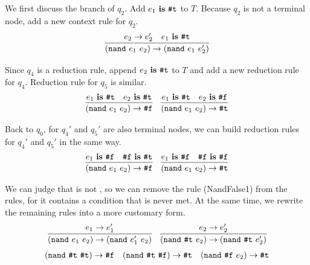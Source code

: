 \begin{example}
    We first discuss the branch of $q_2$. Add $e_1~\mbox{\rm \bf is}~\mbox{\tt \#t}$ to $T$. Because $q_2$ is not a terminal node, add a new context rule for $q_2$.
    \[
        \infer{(\m{nand}~e_1~e_2) \to (\m{nand}~e_1~e_2')}{e_2 \to e_2'\quad e_1~\key{is}~\m{\#t}}
    \]

    Since $q_4$ is a reduction rule, append $e_2~\mbox{\rm \bf is}~\mbox{\tt \#t}$ to $T$ and add a new reduction rule for $q_4$. Reduction rule for $q_5$ is similar.
    \[
        \begin{array}{c}
            \infer{(\m{nand}~e_1~e_2) \to \m{\#f}}{e_1~\key{is}~\m{\#t}\quad e_2~\key{is}~\m{\#t}}
            \quad
            \infer{(\m{nand}~e_1~e_2) \to \m{\#t}}{e_1~\key{is}~\m{\#t}\quad e_2~\key{is}~\m{\#f}}
        \end{array}
    \]

    Back to $q_0$, for $q_4'$ and $q_5'$ are also terminal nodes, we can build reduction rules for $q_4'$ and $q_5'$ in the same way.
    \[
        \begin{array}{c}
            \infer{(\m{nand}~e_1~e_2) \to \m{\#f}}{e_1~\key{is}~\m{\#f}\quad \m{\#f}~\key{is}~\m{\#t}}
            \quad
            \infer{(\m{nand}~e_1~e_2) \to \m{\#t}}{e_1~\key{is}~\m{\#f}\quad \m{\#f}~\key{is}~\m{\#f}}
        \end{array}
    \]

    We can judge that  is not , so we can remove the rule (NandFalse1) from the rules, for it contains a condition that is never met. At the same time, we rewrite the remaining rules into a more customary form.
    \[
        \begin{array}{cc}
            \infer{(\m{nand}~e_1~e_2) \to (\m{nand}~e_1'~e_2)}{e_1 \to e_1'}
             &
            \infer{(\m{nand}~\m{\#t}~e_2) \to (\m{nand}~\m{\#t}~e_2')}{e_2 \to e_2'}
        \end{array}
    \]\[
        \begin{array}{ccc}
            (\mbox{\tt nand}~\mbox{\tt \#t}~\mbox{\tt \#t}) \to \mbox{\tt \#f}
             &
            (\mbox{\tt nand}~\mbox{\tt \#t}~\mbox{\tt \#f}) \to \mbox{\tt \#t}
             &
            (\mbox{\tt nand}~\mbox{\tt \#f}~e_2) \to \mbox{\tt \#t}
        \end{array}
    \]
    \myend
\end{example}


